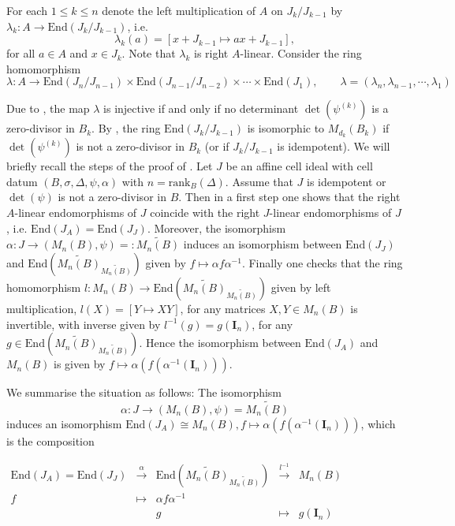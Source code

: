 \documentclass[oneside, a4paper, 11pt]{amsart}
\newcommand{\rank}{\mathrm{rank}}
\newcommand{\End}{\mathrm{End}}
\newcommand{\idm}{\mathbf{I}_n}
\begin{document}
For each $1\leq k \leq n$ denote the left multiplication of $A$ on $J_k/J_{k-1}$
by 
$\lambda_k: A \to \End( {J_k/J_{k-1}} )$, i.e. 
$$\lambda_k(a)=[x+J_{k-1} \mapsto ax + J_{k-1}],$$ for all $a\in A$ and $x\in J_k$. Note that $\lambda_k$ is right $A$-linear. Consider the ring homomorphism
\begin{equation}
    \lambda: A \to \End( {J_n/J_{n-1}} ) \times \End( {J_{n-1}/J_{n-2}} ) \times \cdots \times \End( {J_1} ), \qquad \lambda = (\lambda_n, \lambda_{n-1}, \cdots, \lambda_1)
\end{equation}

Due to \cite[Lemmas 4.2, 3.2]{CKLS}, the map $\lambda$ is injective if and only if no determinant $\det(\psi^{(k)})$ is a zero-divisor in $B_k$. By \cite[Theorem 3.3]{CKLS}, the ring $\End( {J_k/J_{k-1}})$ is isomorphic to $M_{d_k}(B_k)$ if $\det(\psi^{(k)})$ is not a zero-divisor in $B_k$ (or if  $J_k/J_{k-1}$ is idempotent).  We will briefly recall the steps of the proof of \cite[Theorem 3.3]{CKLS}. Let $J$ be an affine cell ideal with cell datum $(B,\sigma, \Delta, \psi,\alpha)$ with $n=\rank_B(\Delta)$. Assume that $J$ is idempotent or $\det(\psi)$ is not a zero-divisor in $B$.  Then in a first step one shows that the right $A$-linear endomorphisms of $J$ coincide with the right $J$-linear endomorphisms  of $J$, i.e. $\End(J_A)=\End(J_J)$. Moreover, the isomorphism $\alpha: J \to (M_n(B),\psi)=:\widetilde{M_n(B)}$ induces an isomorphism between $\End(J_J)$ and $\End({\widetilde{M_n(B)}_{\widetilde{M_n(B)}}})$ given by $f\mapsto \alpha f \alpha^{-1}$.  Finally one checks that the ring homomorphism $l:M_n(B)\to \End({\widetilde{M_n(B)}_{\widetilde{M_n(B)}}})$ given by left multiplication, $l(X)=[Y\mapsto XY]$, for any matrices $X,Y \in M_n(B)$ is invertible, with inverse given by $l^{-1}(g) = g(\idm)$, for any $g\in \End({\widetilde{M_n(B)}_{\widetilde{M_n(B)}}})$. Hence the isomorphism between $\End(J_A)$ and $M_n(B)$ is given by $f\mapsto \alpha(f(\alpha^{-1}(\idm)))$.

We summarise the situation as follows:
The isomorphism $$\alpha: J \to (M_n(B),\psi)= \widetilde{M_n(B)}$$
induces an isomorphism $\End(J_A) \cong  M_n(B), 
f  \mapsto  \alpha(f(\alpha^{-1}(\idm)))$,                       
                        which is the composition \medskip

\begin{center}
$\begin{array}{ccccc}
  \End(J_A) = \End(J_J) & \stackrel{\alpha}{\rightarrow} &
\End({\widetilde{M_n(B)}_{\widetilde{M_n(B)}}}) &
\stackrel{l^{-1}}{\rightarrow} & M_n(B) \\
f & \mapsto & \alpha f \alpha^{-1} & & \\
& & g & \mapsto & g(\idm)
 \end{array}$
 \end{center}
\end{document}
